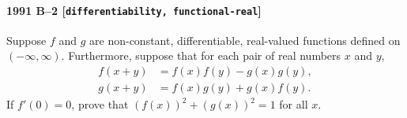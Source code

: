 \paragraph{1991 B--2 \textnormal{[\texttt{differentiability, functional-real}]}}
Suppose $f$ and $g$ are non-constant, differentiable, real-valued
functions defined on $(-\infty, \infty)$. Furthermore, suppose that for
each pair of real numbers $x$ and $y$,
\begin{align*}
f(x+y) &= f(x)f(y) - g(x)g(y), \\
g(x+y) &= f(x)g(y) + g(x)f(y).
\end{align*}
If $f'(0) = 0$, prove that $(f(x))^2 + (g(x))^2 = 1$ for all $x$.
